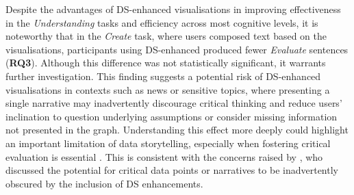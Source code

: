Despite the advantages of DS-enhanced visualisations in improving effectiveness in the \textit{Understanding} tasks and efficiency across most cognitive levels, it is noteworthy that in the \textit{Create} task, where users composed text based on the visualisations, participants using DS-enhanced produced fewer \textit{Evaluate} sentences (\textbf{RQ3}). Although this difference was not statistically significant, it warrants further investigation. This finding suggests a potential risk of DS-enhanced visualisations in contexts such as news or sensitive topics, where presenting a single narrative may inadvertently discourage critical thinking and reduce users' inclination to question underlying assumptions or consider missing information not presented in the graph. Understanding this effect more deeply could highlight an important limitation of data storytelling, especially when fostering critical evaluation is essential \cite{srinivasan2019augmenting}. This is consistent with the concerns raised by \citet{milesi2024storytelling}, who discussed the potential for critical data points or narratives to be inadvertently obscured by the inclusion of DS enhancements.

